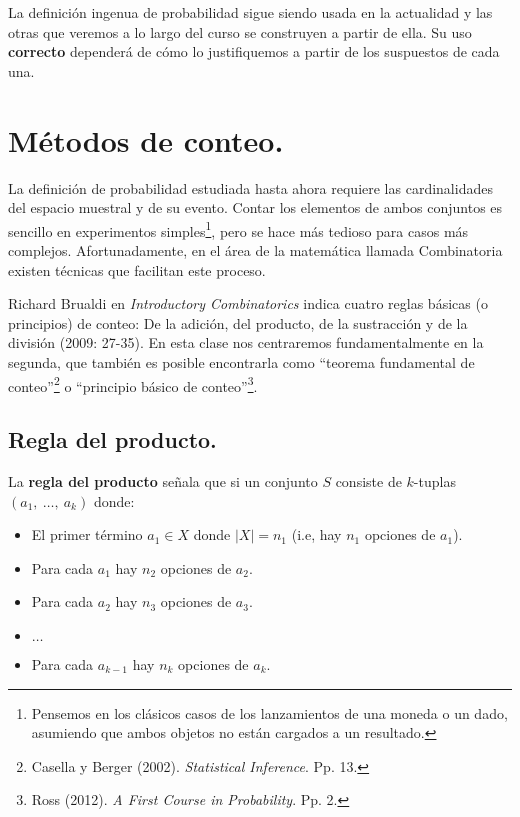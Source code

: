 \documentclass[12pt]{article}
\begin{document}
La definición ingenua de probabilidad sigue siendo usada en la actualidad y las otras que veremos a lo largo del curso se construyen a partir de ella. Su uso \textbf{correcto} dependerá de cómo lo justifiquemos a partir de los suspuestos de cada una.


\section{Métodos de conteo.}

La definición de probabilidad estudiada hasta ahora requiere las cardinalidades del espacio muestral y de su evento. Contar los elementos de ambos conjuntos es sencillo en experimentos simples\footnote{Pensemos en los clásicos casos de los lanzamientos de una moneda o un dado, asumiendo que ambos objetos no están cargados a un resultado.}, pero se hace más tedioso para casos más complejos. Afortunadamente, en el área de la matemática llamada Combinatoria existen técnicas que facilitan este proceso.

Richard Brualdi en \textit{Introductory Combinatorics} indica cuatro reglas básicas (o principios) de conteo: De la adición, del producto, de la sustracción y de la división (2009: 27-35). En esta clase nos centraremos fundamentalmente en la segunda, que también es posible encontrarla como ``teorema fundamental de conteo''\footnote{Casella y Berger (2002). \textit{Statistical Inference}. Pp. 13.} o ``principio básico de conteo''\footnote{Ross (2012). \textit{A First Course in Probability}. Pp. 2.}.

\subsection{Regla del producto.}

La \textbf{regla del producto} señala que si un conjunto $S$ consiste de $k$-tuplas $(a_{1}, \ \ldots, \ a_{k})$ donde:

\begin{itemize}
\item El primer término $a_{1} \in X$ donde $|X| = n_{1}$ (i.e, hay $n_{1}$ opciones de $a_{1}$).
\item Para cada $a_{1}$ hay $n_{2}$ opciones de $a_{2}$.
\item Para cada $a_{2}$ hay $n_{3}$ opciones de $a_{3}$.
\item $\ldots$
\item Para cada $a_{k - 1}$ hay $n_{k}$ opciones de $a_{k}$.
\end{itemize}
\end{document}
